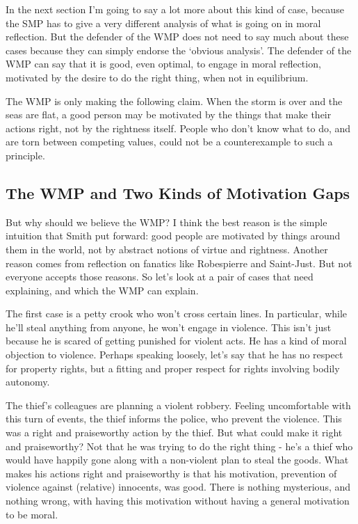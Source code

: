 \documentclass[
  10pt,
  letterpaper,
  twoside]{scrbook}
\begin{document}
In the next section I'm going to say a lot more about this kind of case,
because the SMP has to give a very different analysis of what is going
on in moral reflection. But the defender of the WMP does not need to say
much about these cases because they can simply endorse the `obvious
analysis'. The defender of the WMP can say that it is good, even
optimal, to engage in moral reflection, motivated by the desire to do
the right thing, when not in equilibrium.

The WMP is only making the following claim. When the storm is over and
the seas are flat, a good person may be motivated by the things that
make their actions right, not by the rightness itself. People who don't
know what to do, and are torn between competing values, could not be a
counterexample to such a principle.

\subsection{The WMP and Two Kinds of Motivation
Gaps}\label{thewmpandtwokindsofmotivationgaps}

But why should we believe the WMP? I think the best reason is the simple
intuition that Smith put forward: good people are motivated by things
around them in the world, not by abstract notions of virtue and
rightness. Another reason comes from reflection on fanatics like
{Robespierre} and {Saint-Just}. But not everyone accepts those reasons.
So let's look at a pair of cases that need explaining, and which the WMP
can explain.

The first case is a petty crook who won't cross certain lines. In
particular, while he'll steal anything from anyone, he won't engage in
violence. This isn't just because he is scared of getting punished for
violent acts. He has a kind of moral objection to violence. Perhaps
speaking loosely, let's say that he has no respect for property rights,
but a fitting and proper respect for rights involving bodily autonomy.

The thief's colleagues are planning a violent robbery. Feeling
uncomfortable with this turn of events, the thief informs the police,
who prevent the violence. This was a right and praiseworthy action by
the thief. But what could make it right and praiseworthy? Not that he
was trying to do the right thing - he's a thief who would have happily
gone along with a non-violent plan to steal the goods. What makes his
actions right and praiseworthy is that his motivation, prevention of
violence against (relative) innocents, was good. There is nothing
mysterious, and nothing wrong, with having this motivation without
having a general motivation to be moral.
\end{document}
